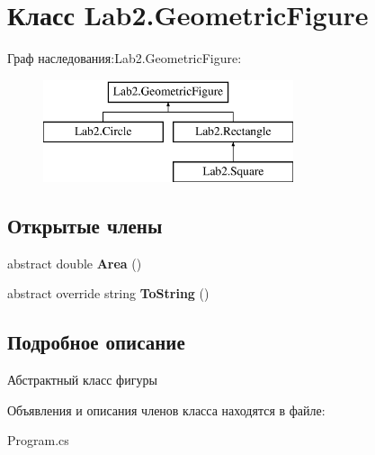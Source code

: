 \hypertarget{class_lab2_1_1_geometric_figure}{}\section{Класс Lab2.\+Geometric\+Figure}
\label{class_lab2_1_1_geometric_figure}
Граф наследования\+:Lab2.\+Geometric\+Figure\+:\begin{figure}[H]
\begin{center}
\leavevmode
\includegraphics[height=3.000000cm]{class_lab2_1_1_geometric_figure}
\end{center}
\end{figure}
\subsection*{Открытые члены}
\begin{DoxyCompactItemize}
\item 
\mbox{\label{class_lab2_1_1_geometric_figure_aeb0853b133cedd1d23f5d8a1d73af8a8}} 
abstract double {\bfseries Area} ()
\item 
\mbox{\label{class_lab2_1_1_geometric_figure_a2f466edc438f43540ead2bc66925ef0a}} 
abstract override string {\bfseries To\+String} ()
\end{DoxyCompactItemize}


\subsection{Подробное описание}
Абстрактный класс фигуры 

Объявления и описания членов класса находятся в файле\+:\begin{DoxyCompactItemize}
\item 
Program.\+cs\end{DoxyCompactItemize}
